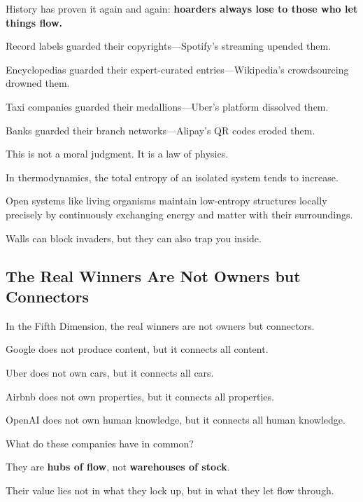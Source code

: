 \vspace{1em}

History has proven it again and again: \textbf{hoarders always lose to those who let things flow.}

Record labels guarded their copyrights---Spotify's streaming upended them.

Encyclopedias guarded their expert-curated entries---Wikipedia's crowdsourcing drowned them.

Taxi companies guarded their medallions---Uber's platform dissolved them.

Banks guarded their branch networks---Alipay's QR codes eroded them.

\vspace{1em}

This is not a moral judgment. It is a law of physics.

In thermodynamics, the total entropy of an isolated system tends to increase.

Open systems like living organisms maintain low-entropy structures locally precisely by continuously exchanging energy and matter with their surroundings.


\begin{importantbox}
Walls can block invaders, but they can also trap you inside.
\end{importantbox}

\subsection{The Real Winners Are Not Owners but Connectors}

In the Fifth Dimension, the real winners are not owners but connectors.

Google does not produce content, but it connects all content.

Uber does not own cars, but it connects all cars.

Airbnb does not own properties, but it connects all properties.

OpenAI does not own human knowledge, but it connects all human knowledge.

\vspace{1em}

What do these companies have in common?

They are \textbf{hubs of flow}, not \textbf{warehouses of stock}.

Their value lies not in what they lock up, but in what they let flow through.

